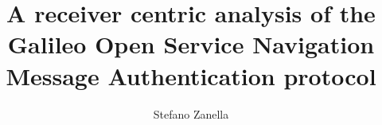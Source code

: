 
\title{A receiver centric analysis of the Galileo Open Service Navigation
Message Authentication protocol}
\author{Stefano Zanella}


